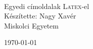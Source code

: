 \documentclass{book}
\begin{document}
\begin{titlepage}
\null
\vspace{3 cm}
\\\Large{\textrm{Egyedi címoldalak }\textsc{Latex}\textrm{-el}} 
\\
\vspace{5 cm}
\textsf{Készítette: Nagy Xavér}
\\[4 cm]
\textsf{Miskolci Egyetem}

\today
\end{titlepage}
\end{document}
